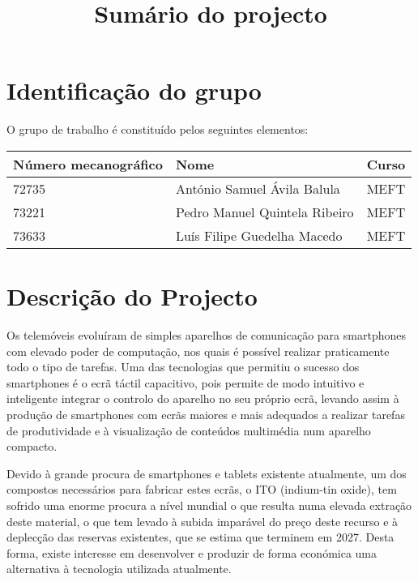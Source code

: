 \documentclass[%
	nofootinbib,
	amsmath,amssymb,
	aps,
	12pt,
	a4paper
]{article}
\begin{document}


\title{Sumário do projecto}
\date{}
\maketitle


\section{Identificação do grupo}
O grupo de trabalho é constituído pelos seguintes elementos:

\begin{center}
	\begin{tabular}{lll}
		Número mecanográfico	&Nome			&Curso	\\ \hline
		72735					&António Samuel Ávila Balula	&MEFT	\\
		73221					&Pedro Manuel Quintela Ribeiro	&MEFT	\\
		73633					&Luís Filipe Guedelha Macedo 	&MEFT	\\
	\end{tabular}
\end{center}

\section{Descrição do Projecto}
Os telemóveis evoluíram de simples aparelhos de comunicação para smartphones com elevado poder de computação, nos quais é possível realizar praticamente todo o tipo de tarefas. Uma das tecnologias que permitiu o sucesso dos smartphones é o ecrã táctil capacitivo, pois permite de modo intuitivo e inteligente integrar o controlo do aparelho no seu próprio ecrã, levando assim à produção de smartphones com ecrãs maiores e mais adequados a realizar tarefas de produtividade e à visualização de conteúdos multimédia num aparelho compacto.

Devido à grande procura de smartphones e tablets existente atualmente, um dos compostos necessários para fabricar estes ecrãs, o ITO (indium-tin oxide), tem sofrido uma enorme procura a nível mundial o que resulta numa elevada extração deste material, o que tem levado à subida imparável do preço deste recurso e à deplecção das reservas existentes, que se estima que terminem em 2027. Desta forma, existe interesse em desenvolver e produzir de forma económica uma alternativa à tecnologia utilizada atualmente.
\end{document}
